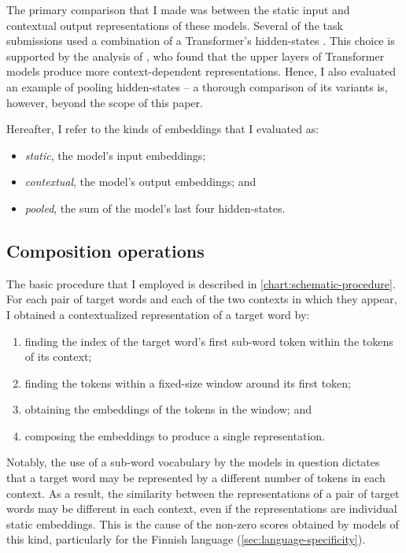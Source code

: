 The primary comparison that I made was between the static input and contextual output
representations of these models.
Several of the task submissions used a combination of a Transformer's hidden-states
\parencites[e.g.][276]{Gamallo2020}[61]{CostellaPessutto2020}[145]{Hettiarachchi2020}.
This choice is supported by the analysis of \textcite{Ethayarajh2019}, who found that
the upper layers of Transformer models produce more context-dependent representations.
Hence, I also evaluated an example of pooling hidden-states -- a thorough comparison of
its variants is, however, beyond the scope of this paper.
\begin{samepage}
  Hereafter, I refer to the kinds of embeddings that I evaluated as:
  \begin{itemize}
    \item \emph{static}, the model's input embeddings;
    \item \emph{contextual}, the model's output embeddings; and
    \item \emph{pooled}, the sum of the model's last four hidden-states.
  \end{itemize}
\end{samepage}

\subsection{Composition operations}
\label{sec:composition-operations}

The basic procedure that I employed is described in \cref{chart:schematic-procedure}.
For each pair of target words and each of the two contexts in which they appear, I
obtained a contextualized representation of a target word by:
\begin{enumerate}
  \item finding the index of the target word's first sub-word token within the tokens of its context;
  \item finding the tokens within a fixed-size window around its first token;
  \item obtaining the embeddings of the tokens in the window; and
  \item composing the embeddings to produce a single representation.
\end{enumerate}
Notably, the use of a sub-word vocabulary by the models in question
\parencite[e.g.,][4174]{Devlin2019} dictates that a target word may be represented by a
different number of tokens in each context.
As a result, the similarity between the representations of a pair of target words may
be different in each context, even if the representations are individual static
embeddings.
This is the cause of the non-zero scores obtained by models of this kind, particularly
for the Finnish language (\cref{sec:language-specificity}).

